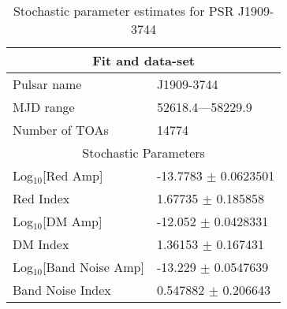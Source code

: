\documentclass{article}
\begin{document}
\begin{table*}
\caption{Stochastic parameter estimates for PSR J1909-3744}
\begin{tabular}{ll}
\hline\hline
\multicolumn{2}{c}{Fit and data-set} \\ 
\hline
Pulsar name\dotfill & J1909-3744 \\ 
MJD range\dotfill & 52618.4---58229.9 \\ 
Number of TOAs\dotfill & 14774 \\
\hline
\multicolumn{2}{c}{Stochastic Parameters} \\ 
\hline
Log$_{10}$[Red Amp] \dotfill & -13.7783 $\pm$ 0.0623501  \\ 
Red Index \dotfill & 1.67735 $\pm$ 0.185858  \\ 
Log$_{10}$[DM Amp] \dotfill & -12.052 $\pm$ 0.0428331  \\ 
DM Index \dotfill & 1.36153 $\pm$ 0.167431  \\ 
Log$_{10}$[Band Noise Amp] \dotfill & -13.229 $\pm$ 0.0547639  \\ 
Band Noise Index \dotfill & 0.547882 $\pm$ 0.206643  \\ 
\hline
\end{tabular}
\label{Table:J1909-3744}
\end{table*} 
\end{document}
